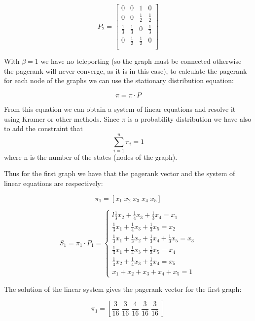 \documentclass{article}
\begin{document}
\begin{equation} \label{eq:matriceTransizione2}
P_{2} =
\begin{bmatrix}
    0 & 0 & 1 & 0  \\
    0 & 0 & \frac{1}{2} & \frac{1}{2}  \\
   \frac{1}{3} & \frac{1}{3} & 0 &  \frac{1}{3}  \\
        0 & \frac{1}{2} & \frac{1}{2} & 0  \\
\end{bmatrix}
\end{equation}

With $\beta = 1$ we have no teleporting (so the graph must be connected otherwise the pagerank will never converge, as it is in this case), to calculate the pagerank for each node of the graphs we can use the stationary distribution equation:

$$\pi = \pi \cdot P$$ 

From this equation we can obtain a system of linear equations and resolve it using Kramer or other methods. Since $\pi$ is a probability distribution we have also to add the constraint that 
$$ \sum_{i=1}^{n} \pi_{i} = 1 $$
where n is the number of the states (nodes of the graph).

Thus for the first graph we have that the pagerank vector and the system of linear equations are respectively:

$$
\pi_{1} = \left[ x_{1} \; x_{2} \; x_{3} \; x_{4} \; x_{5} \right]
$$

$$
S_{1} = \pi_{1} \cdot P_{1} = 
\begin{cases}{l}
\frac{1}{3}x_{2} + \frac{1}{4}x_{3} + \frac{1}{3}x_{4}  =   x_{1}   \\
\frac{1}{3}x_{1} + \frac{1}{4}x_{3} + \frac{1}{3}x_{5}  =   x_{2}   \\
\frac{1}{3}x_{1} + \frac{1}{3}x_{2} + \frac{1}{3}x_{4} + \frac{1}{3}x_{5}  =   x_{3}  \\
\frac{1}{3}x_{1} + \frac{1}{4}x_{3} + \frac{1}{3}x_{5}  =   x_{4}   \\
\frac{1}{3}x_{2} + \frac{1}{4}x_{3} + \frac{1}{3}x_{4}  =   x_{5}   \\
x_{1} + x_{2} + x_{3} + x_{4} + x_{5} = 1
\end{cases}
$$

The solution of the linear system gives the pagerank vector for the first graph:

$$\pi_{1} = \left[ \frac{3}{16} \; \frac{3}{16} \; \frac{4}{16} \; \frac{3}{16} \; \frac{3}{16} \; \right]$$
\end{document}
